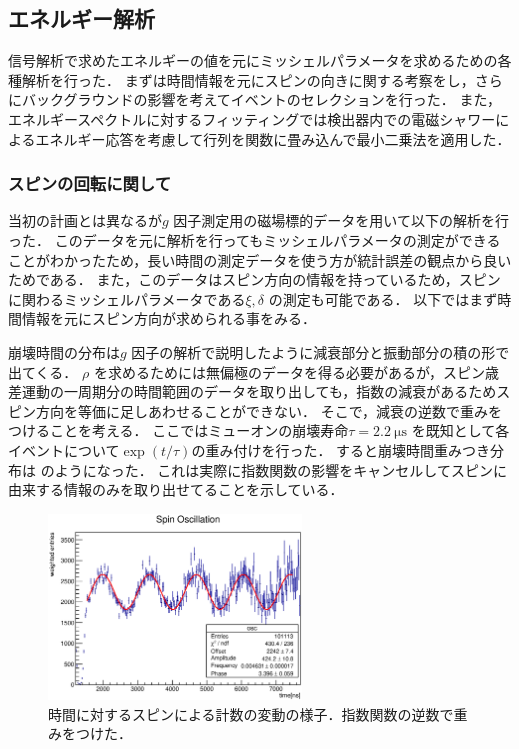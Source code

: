 %

\subsection{エネルギー解析}
信号解析で求めたエネルギーの値を元にミッシェルパラメータを求めるための各種解析を行った．
まずは時間情報を元にスピンの向きに関する考察をし，さらにバックグラウンドの影響を考えてイベントのセレクションを行った．
また，エネルギースペクトルに対するフィッティングでは検出器内での電磁シャワーによるエネルギー応答を考慮して行列を関数に畳み込んで最小二乗法を適用した．

\subsubsection{スピンの回転に関して}
当初の計画とは異なるが$g$ 因子測定用の磁場標的データを用いて以下の解析を行った．
このデータを元に解析を行ってもミッシェルパラメータの測定ができることがわかったため，長い時間の測定データを使う方が統計誤差の観点から良いためである．
また，このデータはスピン方向の情報を持っているため，スピンに関わるミッシェルパラメータである$\xi,\delta$ の測定も可能である．
以下ではまず時間情報を元にスピン方向が求められる事をみる．

崩壊時間の分布は$g$ 因子の解析で説明したように減衰部分と振動部分の積の形で出てくる．
$\rho$ を求めるためには無偏極のデータを得る必要があるが，スピン歳差運動の一周期分の時間範囲のデータを取り出しても，指数の減衰があるためスピン方向を等価に足しあわせることができない．
そこで，減衰の逆数で重みをつけることを考える．
ここではミューオンの崩壊寿命$\tau=2.2~\mathrm{\mu s}$ を既知として各イベントについて$\exp(t/\tau)$の重み付けを行った．
すると崩壊時間重みつき分布は のようになった．
これは実際に指数関数の影響をキャンセルしてスピンに由来する情報のみを取り出せてることを示している．

\begin{figure}[hbt]
\centering
\includegraphics[width=0.6\textwidth]{figure/hatano/oscillation.eps}
\caption{時間に対するスピンによる計数の変動の様子．指数関数の逆数で重みをつけた．}
\label{hatano_fig:oscillation}
\end{figure}

